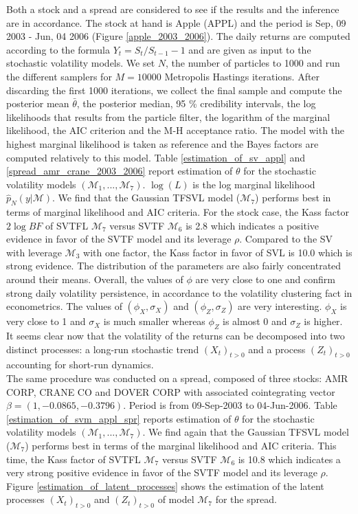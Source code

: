 \documentclass[11pt,a4,twosided,singlespacing,titlepagenumber=on]{scrreprt}
\numberwithin{equation}{chapter} %
\theoremstyle{remark}
\begin{document}
Both a stock and a spread are considered to see if the results and the inference are in accordance. The stock at hand is Apple (APPL) and the period is Sep, 09 2003 - Jun, 04 2006 (Figure \ref{apple_2003_2006}). The daily returns are computed according to the formula $Y_t = S_t / S_{t-1} - 1$ and are given as input to the stochastic volatility models. We set $N$, the number of particles to 1000 and run the different samplers for $M = 10000$ Metropolis Hastings iterations. After discarding the first 1000 iterations, we collect the final sample and compute the posterior mean $\bar{\theta}$, the posterior median, 95 \% credibility intervals, the log likelihoods that results from the particle filter, the logarithm of the marginal likelihood, the AIC criterion and the M-H acceptance ratio. The model with the highest marginal likelihood is taken as reference and the Bayes factors are computed relatively to this model. Table \ref{estimation_of_sv_appl} and \ref{spread_amr_crane_2003_2006} report estimation of $\theta$ for the stochastic volatility models $(\mathcal{M}_1, ..., \mathcal{M}_7)$. $\log (L)$ is the log marginal likelihood $\hat{p}_N(y| \mathcal{M})$. We find that the Gaussian TFSVL model ($\mathcal{M}_7$) performs best in terms of marginal likelihood and AIC criteria. For the stock case, the Kass factor $2 \log BF$ of SVTFL $\mathcal{M}_7$ versus SVTF $\mathcal{M}_6$ is 2.8 which indicates a positive evidence in favor of the SVTF model and its leverage $\rho$. Compared to the SV with leverage $\mathcal{M}_3$ with one factor, the Kass factor in favor of SVL is 10.0 which is strong evidence. The distribution of the parameters are also fairly concentrated around their means. Overall, the values of $\phi$ are very close to one and confirm strong daily volatility persistence, in accordance to the volatility clustering fact in econometrics. The values of $(\phi_X, \sigma_X)$ and $(\phi_Z, \sigma_Z)$ are very interesting. $\phi_X$ is very close to 1 and $\sigma_X$ is much smaller whereas $\phi_Z$ is almost 0 and $\sigma_Z$ is higher. It seems clear now that the volatility of the returns can be decomposed into two distinct processes: a long-run stochastic trend $(X_t)_{t>0}$ and a process $(Z_t)_{t>0}$ accounting for short-run dynamics. \\

The same procedure was conducted on a spread, composed of three stocks: AMR CORP, CRANE CO and DOVER CORP with associated cointegrating vector $\beta = (1, -0.0865, -0.3796)$. Period is from 09-Sep-2003 to 04-Jun-2006. Table \ref{estimation_of_svm_appl_spr} reports estimation of $\theta$ for the stochastic volatility models $(\mathcal{M}_1, ..., \mathcal{M}_7)$. We find again that the Gaussian TFSVL model ($\mathcal{M}_7$) performs best in terms of the marginal likelihood and AIC criteria. This time, the Kass factor of SVTFL $\mathcal{M}_7$ versus SVTF $\mathcal{M}_6$ is 10.8 which indicates a very strong positive evidence in favor of the SVTF model and its leverage $\rho$. Figure \ref{estimation_of_latent_processes} shows the estimation of the latent processes $(X_t)_{t>0}$ and $(Z_t)_{t>0}$ of model $\mathcal{M}_7$ for the spread. 
\end{document}
